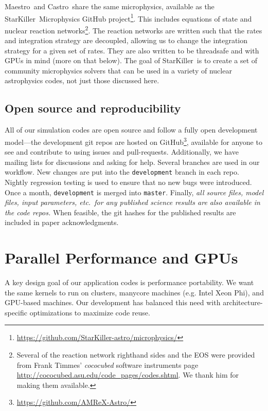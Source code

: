 \documentclass[a4paper]{jpconf}
\newcommand{\maestro}{{\sffamily Maestro}}
\newcommand{\castro}{{\sffamily Castro}}
\newcommand{\starkiller}{{\sffamily StarKiller}}
\begin{document}
\maestro\ and \castro\ share the same microphysics, available as the
\starkiller\ Microphysics GitHub
project\footnote{\url{https://github.com/StarKiller-astro/microphysics/}}.
This includes equations of state and nuclear reaction
networks\footnote{Several of the reaction network righthand sides and
  the EOS were provided from Frank Timmes' {\em cococubed} software
  instruments page
  \url{http://cococubed.asu.edu/code_pages/codes.shtml}.  We thank him
  for making them available.}.  The reaction networks are written such
that the rates and integration strategy are decoupled, allowing us to
change the integration strategy for a given set of rates.  They are
also written to be threadsafe and with GPUs in mind (more on that
below).  The goal of \starkiller\ is to create a set of community
microphysics solvers that can be used in a variety of nuclear
astrophysics codes, not just those discussed here.


\subsection{Open source and reproducibility}

All of our simulation codes are open source and follow a fully open
development model---the development git repos are hosted on
GitHub\footnote{\url{https://github.com/AMReX-Astro/}}, available for
anyone to see and contribute to using issues and pull-requests.
Additionally, we have mailing lists for discussions and asking for
help.  Several branches are used in our workflow.  New changes are put
into the {\tt development} branch in each repo.  Nightly regression
testing is used to ensure that no new bugs were introduced.  Once a
month, {\tt development} is merged into {\tt master}.  Finally, {\em all source
  files, model files, input parameters, etc.\ for any published
  science results are also available in the code repos.}  When
feasible, the git hashes for the published results are included in
paper acknowledgments.




\section{Parallel Performance and GPUs}


A key design goal of our application codes is performance portability.
We want the same kernels to run on clusters, manycore machines (e.g.
Intel Xeon Phi), and GPU-based machines.  Our development has balanced this
need with architecture-specific optimizations to maximize code reuse.
\end{document}
